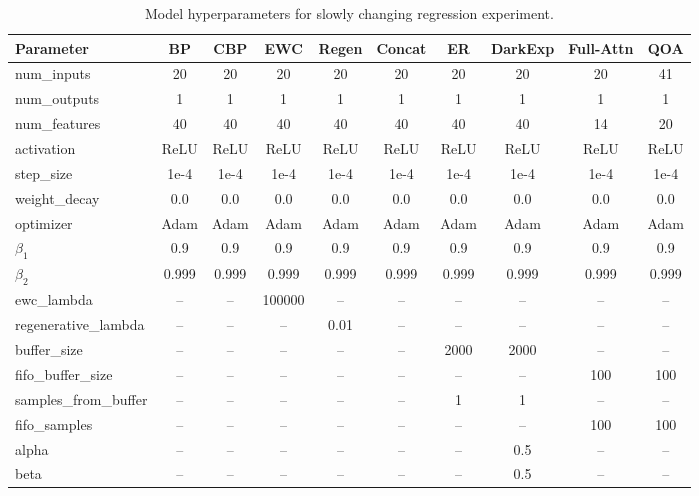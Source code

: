 \documentclass{article}
\begin{document}
\begin{table}[t]
\centering
\footnotesize
\setlength{\tabcolsep}{3pt}

\caption{Model hyperparameters for slowly changing regression experiment.}
\label{tab:scr_model_specs}

\begin{tabular}{lccccccccc}
\toprule
\textbf{Parameter} & \textbf{BP} & \textbf{CBP} & \textbf{EWC} & \textbf{Regen} & \textbf{Concat} & \textbf{ER} & \textbf{DarkExp} & \textbf{Full-Attn} & \textbf{QOA} \\
\midrule
num\_inputs        & 20 & 20 & 20 & 20 & 20 & 20 & 20 & 20 & 41 \\
num\_outputs       & 1  & 1  & 1  & 1  & 1  & 1  & 1  & 1  & 1 \\
num\_features      & 40 & 40 & 40 & 40 & 40 & 40 & 40 & 14 & 20 \\
activation         & ReLU & ReLU & ReLU & ReLU & ReLU & ReLU & ReLU & ReLU & ReLU \\
step\_size         & 1e-4 & 1e-4 & 1e-4 & 1e-4 & 1e-4 & 1e-4 & 1e-4 & 1e-4 & 1e-4 \\
weight\_decay      & 0.0 & 0.0 & 0.0 & 0.0 & 0.0 & 0.0 & 0.0 & 0.0 & 0.0 \\
\midrule
optimizer          & Adam & Adam & Adam & Adam & Adam & Adam & Adam & Adam & Adam \\
$\beta_1$          & 0.9 & 0.9 & 0.9 & 0.9 & 0.9 & 0.9 & 0.9 & 0.9 & 0.9 \\
$\beta_2$          & 0.999 & 0.999 & 0.999 & 0.999 & 0.999 & 0.999 & 0.999 & 0.999 & 0.999 \\
\midrule
ewc\_lambda        & -- & -- & 100000 & -- & -- & -- & -- & -- & -- \\
regenerative\_lambda & -- & -- & -- & 0.01 & -- & -- & -- & -- & -- \\
\midrule
buffer\_size       & -- & -- & -- & -- & -- & 2000 & 2000 & -- & -- \\
fifo\_buffer\_size & -- & -- & -- & -- & -- & -- & -- & 100 & 100 \\
samples\_from\_buffer & -- & -- & -- & -- & -- & 1 & 1 & -- & -- \\
fifo\_samples      & -- & -- & -- & -- & -- & -- & -- & 100 & 100 \\
\midrule
alpha              & -- & -- & -- & -- & -- & -- & 0.5 & -- & -- \\
beta               & -- & -- & -- & -- & -- & -- & 0.5 & -- & -- \\
\bottomrule
\end{tabular}
\end{table}




\newpage

\end{document}
